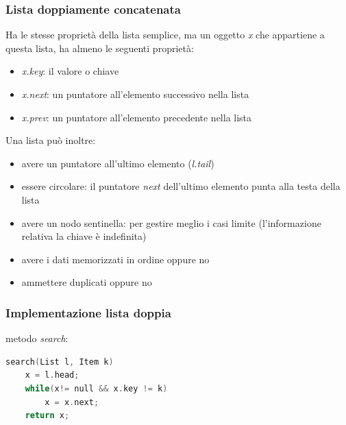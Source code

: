 \documentclass[italian]{article}
\begin{document}
\subsubsection{Lista doppiamente concatenata}
Ha le stesse proprietà della lista semplice, ma un oggetto \textit{x} che appartiene a questa lista, ha almeno le seguenti proprietà:
\begin{itemize}[itemsep=0pt]
	\item \textit{x.key}: il valore o chiave
	\item \textit{x.next}: un puntatore all’elemento successivo nella lista
	\item \textit{x.prev}: un puntatore all’elemento precedente nella lista
\end{itemize}

Una lista può inoltre:
\begin{itemize}[itemsep=0pt]
	\item avere un puntatore all’ultimo elemento (\textit{l.tail})
	\item essere circolare: il puntatore \textit{next} dell’ultimo elemento punta alla testa della lista
	\item avere un nodo sentinella: per gestire meglio i casi limite (l’informazione relativa la chiave è indefinita)
	\item avere i dati memorizzati in ordine oppure no
	\item ammettere duplicati oppure no
\end{itemize}
\pagebreak
\subsubsection{Implementazione lista doppia}
metodo \textit{search}:
\begin{lstlisting}[language=c,mathescape=true]
search(List l, Item k)
	x = l.head;
	while(x!= null && x.key != k)
		x = x.next;
	return x;
\end{lstlisting}
\end{document}
